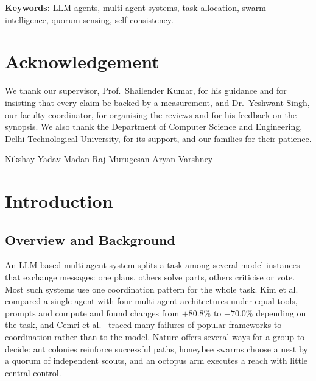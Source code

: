 \documentclass[12pt,a4paper]{article}
\begin{document}
\noindent\textbf{Keywords:} LLM agents, multi-agent systems, task allocation, swarm intelligence,
quorum sensing, self-consistency.

\vspace{1cm}
\section*{Acknowledgement}
We thank our supervisor, Prof.~Shailender Kumar, for his guidance and for insisting that every claim be
backed by a measurement, and Dr.~Yeshwant Singh, our faculty coordinator, for organising the reviews
and for his feedback on the synopsis. We also thank the Department of Computer Science and Engineering,
Delhi Technological University, for its support, and our families for their patience.

\vspace{0.6cm}
\noindent Nikshay Yadav \hfill Madan Raj Murugesan \hfill Aryan Varshney

\clearpage
\tableofcontents

\clearpage
{}

\section{Introduction}

\subsection{Overview and Background}
An LLM-based multi-agent system splits a task among several model instances that exchange messages:
one plans, others solve parts, others criticise or vote. Most such systems use one coordination pattern
for the whole task. Kim et al.~\cite{kim2025scaling} compared a single agent with four multi-agent
architectures under equal tools, prompts and compute and found changes from $+80.8\%$ to $-70.0\%$
depending on the task, and Cemri et al.~\cite{cemri2025mast} traced many failures of popular frameworks to
coordination rather than to the model. Nature offers several ways for a group to decide: ant colonies
reinforce successful paths, honeybee swarms choose a nest by a quorum of independent scouts, and an
octopus arm executes a reach with little central control.
\end{document}
